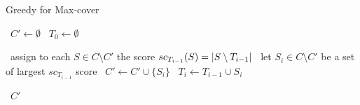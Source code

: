 \begin{algorithm}
    \caption{Greedy for Max-cover}\label{alg:greedy_maxcover}
    \begin{algorithmic}%
            \State~$C' \gets \emptyset$
            \State~$T_0 \gets \emptyset$

                \State~assign to each $S \in C \setminus C'$ the score $sc_{T_{i-1}}(S) = \vert S \setminus T_{i-1} \vert$
                \State~let $S_i \in C \setminus C'$ be a set of largest $sc_{T_{i-1}}$ score
                \State~$C' \gets C' \cup \{ S_i \}$
                \State~$T_i \gets T_{i-1} \cup S_i$
            \EndFor
            
            \Return~$C'$
        \EndProcedure
    \end{algorithmic}
\end{algorithm}